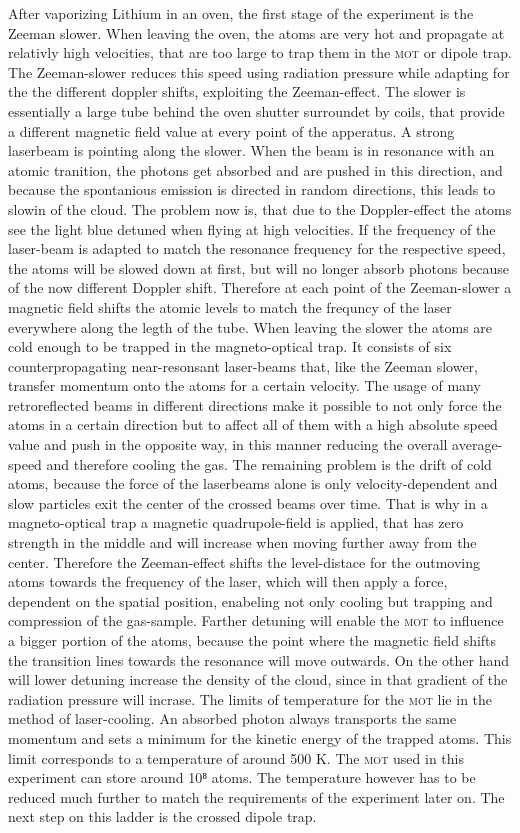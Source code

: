 After vaporizing Lithium in an oven, the first stage of the experiment is the Zeeman slower. When leaving the oven, the atoms are very hot and propagate at relativly high velocities, that are too large to trap them in the \textsc{mot} or dipole trap. The Zeeman-slower reduces this speed using radiation pressure while adapting for the the different doppler shifts, exploiting the Zeeman-effect. The slower is essentially a large tube behind the oven shutter surroundet by coils, that provide a different magnetic field value at every point of the apperatus. A strong laserbeam is pointing along the slower. When the beam is in resonance with an atomic tranition, the photons get absorbed and are pushed in this direction, and  because the spontanious emission is directed in random directions, this leads to slowin of the cloud. The problem now is, that due to the Doppler-effect the atoms see the light blue detuned when flying at high velocities. If the frequency of the laser-beam is adapted to match the resonance frequency for the respective speed, the atoms will be slowed down at first, but will no longer absorb photons because of the now different Doppler shift. Therefore at each point of the Zeeman-slower a magnetic field shifts the atomic levels to match the frequncy of the laser everywhere along the legth of the tube. When leaving the slower the atoms are cold enough to be trapped in the magneto-optical trap. It consists of six counterpropagating near-resonsant laser-beams that, like the Zeeman slower, transfer momentum onto the atoms for a certain velocity. The usage of many retroreflected beams in different directions make it possible to not only force the atoms in a certain direction but to affect all of them with a high absolute speed value and push in the opposite way, in this manner reducing the overall average-speed and therefore cooling the gas. The remaining problem is the drift of cold atoms, because the force of the laserbeams alone is only velocity-dependent and slow particles exit the center of the crossed beams over time. That is why in a magneto-optical trap a magnetic quadrupole-field is applied, that has zero strength in the middle and will increase when moving further away from the center. Therefore the Zeeman-effect shifts the level-distace for the outmoving atoms towards the frequency of the laser, which will then apply a force, dependent on the spatial position, enabeling not only cooling but trapping and compression of the gas-sample. Farther detuning will enable the \textsc{mot} to influence a bigger portion of the atoms, because the point where the magnetic field shifts the transition lines towards the resonance will move outwards. On the other hand will lower detuning increase the density of the cloud, since in that gradient of the radiation pressure will incrase. The limits of temperature for the \textsc{mot} lie in the method of laser-cooling. An absorbed photon always transports the same momentum and sets a minimum for the kinetic energy of the trapped atoms. This limit corresponds to a temperature of around 500 \mu K. The \textsc{mot} used in this experiment can store around 10⁸ atoms. The temperature however has to be reduced much further to match the requirements of the experiment later on. The next step on this ladder is the crossed dipole trap. 